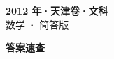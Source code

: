 \documentclass[zihao=-4, a4paper]{ctexart}
\begin{document}
\begin{center}
  {\Large\bfseries 2012 年·天津卷·文科}\\[4pt]
  {\large 数学 · 简答版}
\end{center}
\medskip
{}

\clearpage
{}
\begin{center}{\Large\bfseries 答案速查}\end{center}
\medskip

\end{document}
